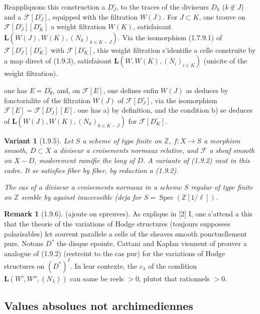 \documentclass[12pt,a4paper]{article}
\theoremstyle{plain}
\newtheorem{variante}[theorem]{Variant}
\theoremstyle{definition}
\newtheorem{remark}[theorem]{Remark}
\theoremstyle{remark}
\DeclareMathOperator{\Spec}{Spec}
\newcommand{\ZZ}{{\mathbb{Z}}}
\begin{document}
Reappliquons this construction a $D_J^\circ$, to the traces of the diviseurs $D_k$ ($k \notin J$) and a $\mathscr{F}[D_J^\circ]$, equipped with the filtration $W(J)$. For $J \subset K$, one trouve on $\mathscr{F}[D_J^\circ][D_K^\circ]$ a weight filtration $W(K)$, satisfaisant $\mathbf{L}(W(J), W(K), (N_k)_{k \in K-J})$. Via the isomorphism (1.7.9.1) of $\mathscr{F}[D_J^\circ][D_K^\circ]$ with $\mathscr{F}[D_K^\circ]$, this weight filtration s'identifie a celle construite by a map direct of (1.9.3), satisfaisant $\mathbf{L}(W, W(K), (N_i)_{i \in K})$ (unicite of the weight filtration).

one has $E = D_\emptyset^\circ$, and, on $\mathscr{F}[E]$, one defines enfin $W(J)$ as deduces by fonctorialite of the filtration $W(J)$ of $\mathscr{F}[D_J^\circ]$, via the isomorphism $\mathscr{F}[E] = \mathscr{F}[D_J^\circ][E]$. one has a) by definition, and the condition b) se deduces of $\mathbf{L}(W(J), W(K), (N_k)_{k \in K-J})$ for $\mathscr{F}[D_K^\circ]$.


\begin{variante}[1.9.5]
Let $S$ a scheme of type finite on $\ZZ$, $f : X \to S$ a morphism smooth, $D \subset X$ a diviseur a croisements normaux relative, and $\mathscr{F}$ a sheaf smooth on $X - D$, moderement ramifie the long of $D$. A variante of (1.9.2) vaut in this cadre. It se satisfies fiber by fiber, by reduction a (1.9.2).

The cas of a diviseur a croisements normaux in a scheme $S$ regular of type finite on $\ZZ$ semble by against inaccessible (deja for $S = \Spec(\ZZ[1/\ell])$.
\end{variante}

\begin{remark}[1.9.6]
(ajoute on epreuves). As explique in [2] I, one s'attend a this that the theorie of the variations of Hodge structures (toujours supposees polarisables) let souvent parallele a celle of the sheaves smooth ponctuellement purs. Notons $D^*$ the disque epointe. Cattani and Kaplan viennent of prouver a analogue of (1.9.2) (restreint to the cas pur) for the variations of Hodge structures on $(D^*)^I$. In leur contexte, the $c_\lambda$ of the condition $\mathbf{L}(W', W'', (N_\lambda))$ can same be reels $> 0$, plutot that rationnels $> 0$.
\end{remark}


\subsection{Values absolues not archimediennes}
\end{document}
